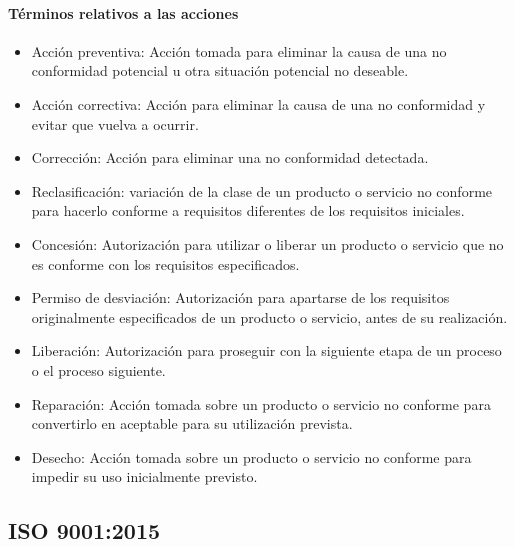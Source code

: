 					\paragraph{Términos relativos a las acciones}
						\begin{itemize}
							\item Acción preventiva: Acción tomada para eliminar la causa de una no conformidad potencial u otra situación potencial
							no deseable.
							
							\item Acción correctiva: Acción para eliminar la causa de una no conformidad y evitar que vuelva a ocurrir.
							
							\item Corrección: Acción para eliminar una no conformidad detectada.
							
							\item Reclasificación: variación de la clase de un producto o servicio no conforme para hacerlo
							conforme a requisitos diferentes de los requisitos iniciales.
							
							\newpage
							\thispagestyle{plain}
							
							\item  Concesión: Autorización para utilizar o liberar un producto o servicio que no es conforme con los requisitos especificados.
							
							\item Permiso de desviación: Autorización para apartarse de los requisitos originalmente especificados de un producto 
							o servicio, antes de su realización.
							
							\item Liberación: Autorización para proseguir con la siguiente etapa de un proceso o el proceso siguiente.
							
							\item Reparación: Acción tomada sobre un producto o servicio no conforme para convertirlo en aceptable para su utilización prevista.
							
							\item Desecho: Acción tomada sobre un producto o servicio no conforme para impedir su uso
							inicialmente previsto.
						\end{itemize}
					
		\subsection{ISO 9001:2015}
